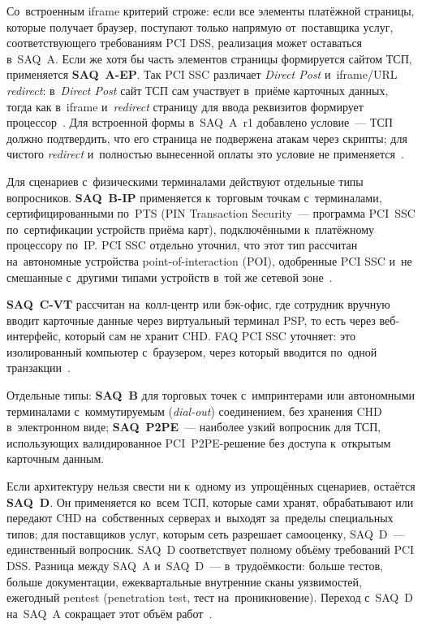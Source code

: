 Со~встроенным iframe критерий строже: если все элементы платёжной страницы,
которые получает браузер, поступают только напрямую от~поставщика услуг,
соответствующего требованиям PCI DSS, реализация может оставаться в~SAQ~A.
Если же хотя бы
часть элементов страницы формируется сайтом ТСП, применяется \textbf{SAQ~A-EP}.
Так PCI SSC различает \textit{Direct Post} и~iframe/URL \textit{redirect}: в~\textit{Direct Post} сайт ТСП
сам участвует в~приёме карточных данных, тогда как в~iframe и~\textit{redirect} страницу
для ввода реквизитов формирует процессор~\cite{pci-faq-1291,pci-faq-1293}. Для
встроенной формы в~SAQ~A~r1 добавлено условие~--- ТСП должно подтвердить, что
его страница не подвержена атакам через скрипты; для чистого \textit{redirect}
и~полностью вынесенной оплаты это условие не
применяется~\cite{pci-saq-a-r1-2025,pci-faq-1588}.

Для сценариев с~физическими терминалами действуют отдельные типы вопросников.
\textbf{SAQ~B-IP} применяется к~торговым точкам с~терминалами,
сертифицированными по~PTS (PIN Transaction Security~--- программа PCI~SSC
по~сертификации устройств приёма карт), подключёнными к~платёжному процессору
по~IP. PCI SSC отдельно уточнил, что этот тип рассчитан
на~автономные устройства point-of-interaction (POI), одобренные PCI SSC и~не
смешанные с~другими типами устройств в~той же сетевой зоне~\cite{pci-faq-1443}.

\textbf{SAQ~C-VT} рассчитан на~колл-центр или бэк-офис, где сотрудник вручную
вводит карточные данные через виртуальный терминал PSP, то есть через
веб-интерфейс, который сам не хранит CHD. FAQ PCI SSC уточняет: это
изолированный компьютер с~браузером, через который вводится по~одной
транзакции~\cite{pci-faq-1229}.

Отдельные типы: \textbf{SAQ~B} для торговых точек с~импринтерами или
автономными терминалами с~коммутируемым (\textit{dial-out}) соединением, без
хранения CHD в~электронном виде; \textbf{SAQ~P2PE}~--- наиболее узкий вопросник
для ТСП, использующих валидированное PCI~P2PE-решение без доступа к~открытым
карточным данным.

Если архитектуру нельзя свести ни к~одному из~упрощённых сценариев, остаётся
\textbf{SAQ~D}. Он применяется ко~всем ТСП, которые сами хранят, обрабатывают
или передают CHD на~собственных серверах и~выходят за~пределы специальных типов;
для поставщиков услуг, которым сеть разрешает самооценку, SAQ~D~--- единственный
вопросник. SAQ~D соответствует полному объёму требований
PCI DSS. Разница между SAQ~A и~SAQ~D~--- в~трудоёмкости: больше тестов, больше
документации, ежеквартальные внутренние сканы уязвимостей, ежегодный pentest
(penetration test, тест на~проникновение). Переход с~SAQ~D на~SAQ~A сокращает
этот объём работ~\cite{pci-saq}.


